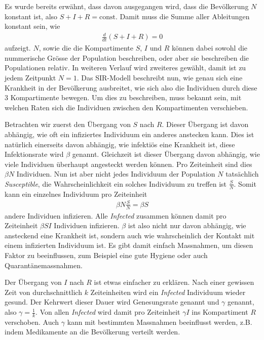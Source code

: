 \begin{refsection}
Es wurde bereits erwähnt, dass davon ausgegangen wird, dass die Bevölkerung $N$ konstant ist, also $S + I + R = \text{const}$. Damit muss die Summe aller Ableitungen konstant sein, wie
\begin{align*}
  \frac{d}{dt}\left(S+I+R\right) = 0
\end{align*}
aufzeigt. 
$N$, sowie die die Kompartimente $S$, $I$ und $R$ können dabei sowohl die nummerische Grösse der Population beschreiben, oder aber sie beschreiben die Populationen relativ. 
In weiteren Verlauf wird zweiteres gewählt, damit ist zu jedem Zeitpunkt $N = 1$.
Das SIR-Modell beschreibt nun, wie genau sich eine Krankheit in der Bevölkerung ausbreitet, wie sich also die Individuen durch diese 3 Kompartimente bewegen.
Um dies zu beschreiben, muss bekannt sein, mit welchen Raten sich die Individuen zwischen den Kompartimenten verschieben.

\begin{figure}[H]
  \centering
  
\end{figure}

Betrachten wir zuerst den Übergang von $S$ nach $R$.
Dieser Übergang ist davon abhängig, wie oft ein infiziertes Individuum ein anderes anstecken kann.
Dies ist natürlich einerseits davon abhängig, wie infektiös eine Krankheit ist, diese Infektionsrate wird $\beta$ genannt.
Gleichzeit ist dieser Übergang davon abhängig, wie viele Individuen überhaupt angesteckt werden können. 
Pro Zeiteinheit sind dies $\beta N$ Individuen.
Nun ist aber nicht jedes Individuum der Population $N$ tatsächlich \emph{Susceptible}, die Wahrscheinlichkeit ein solches Individuum zu treffen ist $\frac{S}{N}$.
Somit kann ein einzelnes Individuum pro Zeiteinheit 
\begin{align*}
  \beta N \frac{S}{N} = \beta S
\end{align*}
andere Individuen infizieren.
Alle \emph{Infected} zusammen können damit pro Zeiteinheit $\beta S I$ Individuen infizieren. 
$\beta$ ist also nicht nur davon abhängig, wie ansteckend eine Krankheit ist, sondern auch wie wahrscheinlich der Kontakt mit einem infizierten Individuum ist. 
Es gibt damit einfach Massnahmen, um diesen Faktor zu beeinflussen, zum Beispiel eine gute Hygiene oder auch Quarantänemassnahmen.

Der Übergang von $I$ nach $R$ ist etwas einfacher zu erklären. 
Nach einer gewissen Zeit von durchschnittlich $k$ Zeiteinheiten wird ein \emph{Infected} Individuum wieder gesund.
Der Kehrwert dieser Dauer wird Genesungsrate genannt und $\gamma$ genannt, also $\gamma = \frac{1}{k}$.
Von allen \emph{Infected} wird damit pro Zeiteinheit $\gamma I$ ins Kompartiment $R$ verschoben.
Auch $\gamma$ kann mit bestimmten Massnahmen beeinflusst werden, z.B. indem Medikamente an die Bevölkerung verteilt werden.


\end{refsection}
